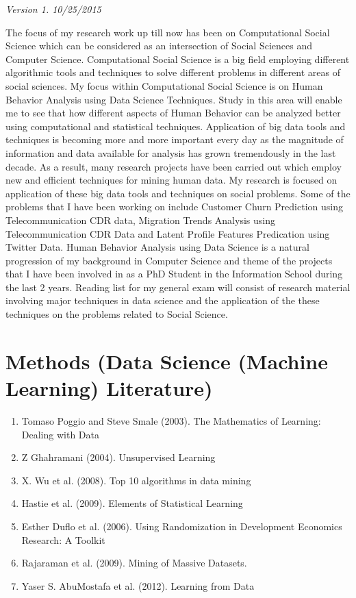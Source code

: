 \textit{Version 1. 10/25/2015} 

The focus of my research work up till now has been on Computational Social Science which can be considered as an intersection of Social Sciences and Computer Science. Computational Social Science is a big field employing different algorithmic tools and techniques to solve different problems in different areas of social sciences. My focus within Computational Social Science is on Human Behavior Analysis using Data Science Techniques. Study in this area will enable me to see that how different aspects of Human Behavior can be analyzed better using computational and statistical techniques.
Application of big data tools and techniques is becoming more and more important every day as the magnitude of information and data available for analysis has grown tremendously in the last decade. As a result, many research projects have been carried out which employ new and efficient techniques for mining human data. My research is focused on application of these big data tools and techniques on social problems. Some of the problems that I have been working on include Customer Churn Prediction using Telecommunication CDR data, Migration Trends Analysis using Telecommunication CDR Data  and Latent Profile Features Predication using Twitter Data.
Human Behavior Analysis using Data Science is a natural progression of my background in Computer Science and theme of the projects that I have been involved in as a PhD Student in the Information School during the last 2 years. 
Reading list for my general exam will consist of research material involving major techniques in data science and the application of the these techniques on the problems related to Social Science. 
\\
\section{Methods (Data Science (Machine Learning) Literature)}
\begin{enumerate}
\item Tomaso Poggio and Steve Smale (2003). The Mathematics of Learning: Dealing with Data\cite{Poggio_2005}
\item Z Ghahramani (2004). Unsupervised Learning \cite{Ghahramani_2004}
\item X. Wu et al. (2008). Top 10 algorithms in data mining \cite{2009}
\item Hastie et al. (2009). Elements of Statistical Learning \cite{StatisticalLearning_2009}
\item Esther Duflo et al. (2006). Using Randomization in Development Economics Research: A Toolkit \cite{Duflo} 
\item Rajaraman et al. (2009). Mining of Massive Datasets. \cite{Rajaraman_2009}
\item Yaser S. AbuMostafa et al. (2012). Learning from Data \cite{Abu-Mostafa:2012:LD:2207825}
\end{enumerate}


